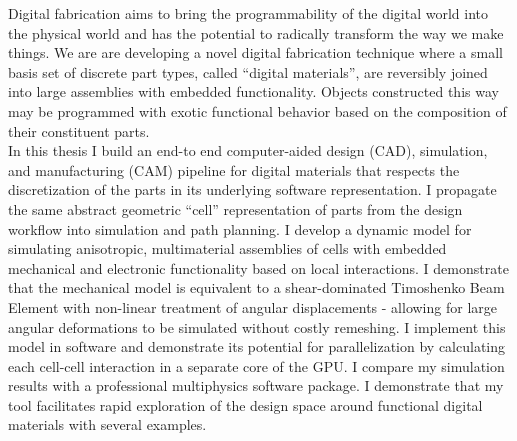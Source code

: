 % 
% 
%

Digital fabrication aims to bring the programmability of the digital world into the physical world and has the potential to radically transform the way we make things.  We are are developing a novel digital fabrication technique where a small basis set of discrete part types, called ``digital materials'', are reversibly joined into large assemblies with embedded functionality.  Objects constructed this way may be programmed with exotic functional behavior based on the composition of their constituent parts.\\

In this thesis I build an end-to end computer-aided design (CAD), simulation, and manufacturing (CAM) pipeline for digital materials that respects the discretization of the parts in its underlying software representation.  I propagate the same abstract geometric ``cell'' representation of parts from the design workflow into simulation and path planning.  I develop a dynamic model for simulating anisotropic, multimaterial assemblies of cells with embedded mechanical and electronic functionality based on local interactions.  I demonstrate that the mechanical model is equivalent to a shear-dominated Timoshenko Beam Element with non-linear treatment of angular displacements - allowing for large angular deformations to be simulated without costly remeshing.  I implement this model in software and demonstrate its potential for parallelization by calculating each cell-cell interaction in a separate core of the GPU.  I compare my simulation results with a professional multiphysics software package.  I demonstrate that my tool facilitates rapid exploration of the design space around functional digital materials with several examples.
